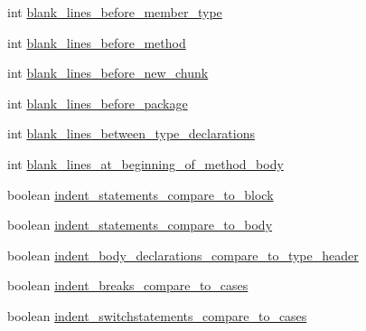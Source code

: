 \begin{DoxyCompactItemize}
int \hyperlink{classorg_1_1eclipse_1_1jdt_1_1ui_1_1tests_1_1refactoring_1_1infra_1_1TestFormatterOptions_a6e3eeaa016846c2ceb6f3716f1c9df36}{blank\_\-lines\_\-before\_\-member\_\-type}
\item 
int \hyperlink{classorg_1_1eclipse_1_1jdt_1_1ui_1_1tests_1_1refactoring_1_1infra_1_1TestFormatterOptions_a86cae376d6001126b19452c4687f7867}{blank\_\-lines\_\-before\_\-method}
\item 
int \hyperlink{classorg_1_1eclipse_1_1jdt_1_1ui_1_1tests_1_1refactoring_1_1infra_1_1TestFormatterOptions_a2b3c8ec3e4683ca25626723d3f3d8077}{blank\_\-lines\_\-before\_\-new\_\-chunk}
\item 
int \hyperlink{classorg_1_1eclipse_1_1jdt_1_1ui_1_1tests_1_1refactoring_1_1infra_1_1TestFormatterOptions_ace03c1b51ddb224446a706abf4b2a776}{blank\_\-lines\_\-before\_\-package}
\item 
int \hyperlink{classorg_1_1eclipse_1_1jdt_1_1ui_1_1tests_1_1refactoring_1_1infra_1_1TestFormatterOptions_a1c745c343d4e1892bf21988841ba53e7}{blank\_\-lines\_\-between\_\-type\_\-declarations}
\item 
int \hyperlink{classorg_1_1eclipse_1_1jdt_1_1ui_1_1tests_1_1refactoring_1_1infra_1_1TestFormatterOptions_a4a82eb14f6cb58266ccf069a7821da8f}{blank\_\-lines\_\-at\_\-beginning\_\-of\_\-method\_\-body}
\item 
boolean \hyperlink{classorg_1_1eclipse_1_1jdt_1_1ui_1_1tests_1_1refactoring_1_1infra_1_1TestFormatterOptions_a347dacb2b9935dfc0a1e561a576af084}{indent\_\-statements\_\-compare\_\-to\_\-block}
\item 
boolean \hyperlink{classorg_1_1eclipse_1_1jdt_1_1ui_1_1tests_1_1refactoring_1_1infra_1_1TestFormatterOptions_a807e8a4ba4d42ed6d74ff33be7c9d3cf}{indent\_\-statements\_\-compare\_\-to\_\-body}
\item 
boolean \hyperlink{classorg_1_1eclipse_1_1jdt_1_1ui_1_1tests_1_1refactoring_1_1infra_1_1TestFormatterOptions_a5ae1777a005f7cc3446d981189708c21}{indent\_\-body\_\-declarations\_\-compare\_\-to\_\-type\_\-header}
\item 
boolean \hyperlink{classorg_1_1eclipse_1_1jdt_1_1ui_1_1tests_1_1refactoring_1_1infra_1_1TestFormatterOptions_a5bb6164a3bf18f898bcbb47a36f10ca0}{indent\_\-breaks\_\-compare\_\-to\_\-cases}
\item 
boolean \hyperlink{classorg_1_1eclipse_1_1jdt_1_1ui_1_1tests_1_1refactoring_1_1infra_1_1TestFormatterOptions_a571ae7fad3174f9285f8fc90ace880c3}{indent\_\-switchstatements\_\-compare\_\-to\_\-cases}
\item 

\end{DoxyCompactItemize}
